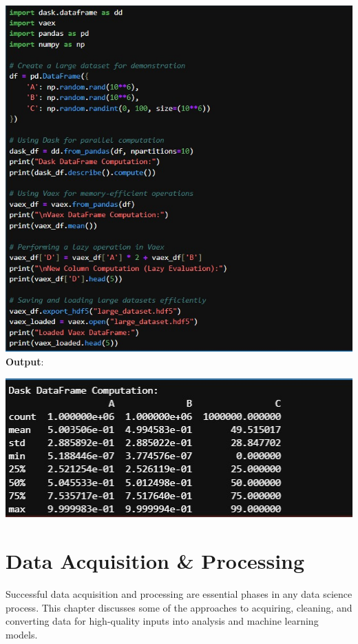 \documentclass{article}
\begin{document}
\includegraphics[width=14cm,height=18
cm]{Dask&Vaex.jpeg}
\newpage
\textbf{Output}:

\includegraphics[width=14cm,height=6
cm]{Dask&Vaex_Output.jpeg}
\newpage
\section{Data Acquisition \& Processing}
Successful data acquisition and processing are essential phases in any data science process. This chapter discusses some of the approaches to acquiring, cleaning, and converting data for high-quality inputs into analysis and machine learning models.
\end{document}
